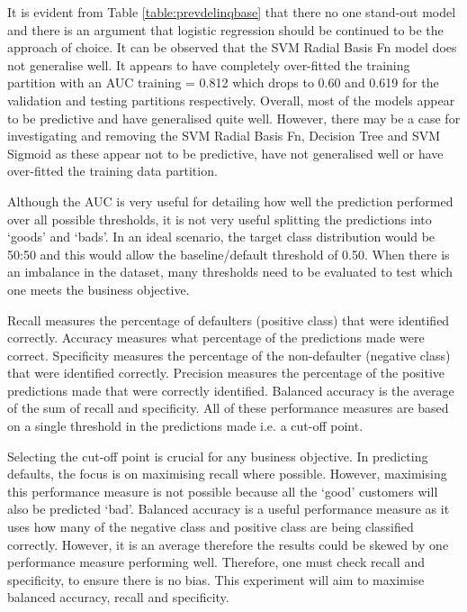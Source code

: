 It is evident from Table \ref{table:prevdelinqbase} that there no one stand-out model and there is an argument that logistic regression should be continued to be the approach of choice. It can be observed that the SVM Radial Basis Fn model does not generalise well. It appears to have completely over-fitted the training partition with an AUC training = 0.812 which drops to 0.60 and 0.619 for the validation and testing partitions respectively. Overall, most of the models appear to be predictive and have generalised quite well. However, there may be a case for investigating and removing the SVM Radial Basis Fn, Decision Tree and SVM Sigmoid as these appear not to be predictive, have not generalised well or have over-fitted the training data partition.  

Although the AUC is very useful for detailing how well the prediction performed over all possible thresholds, it is not very useful splitting the predictions into `goods' and `bads'. In an ideal scenario, the target class distribution would be 50:50 and this would allow the baseline/default threshold of 0.50. When there is an imbalance in the dataset, many thresholds need to be evaluated to test which one meets the business objective.

Recall measures the percentage of defaulters (positive class) that were identified correctly. Accuracy measures what percentage of the predictions made were correct. Specificity measures the percentage of the non-defaulter (negative class) that were identified correctly. Precision measures the percentage of the positive predictions made that were correctly identified. Balanced accuracy is the average of the sum of recall and specificity. All of these performance measures are based on a single threshold in the predictions made i.e. a cut-off point.

Selecting the cut-off point is crucial for any business objective. In predicting defaults, the focus is on maximising recall where possible. However, maximising this performance measure is not possible because all the `good' customers will also be predicted `bad'. Balanced accuracy is a useful performance measure as it uses how many of the negative class and positive class are being classified correctly. However, it is an average therefore the results could be skewed by one performance measure performing well. Therefore, one must check recall and specificity, to ensure there is no bias. This experiment will aim to maximise balanced accuracy, recall and specificity.

